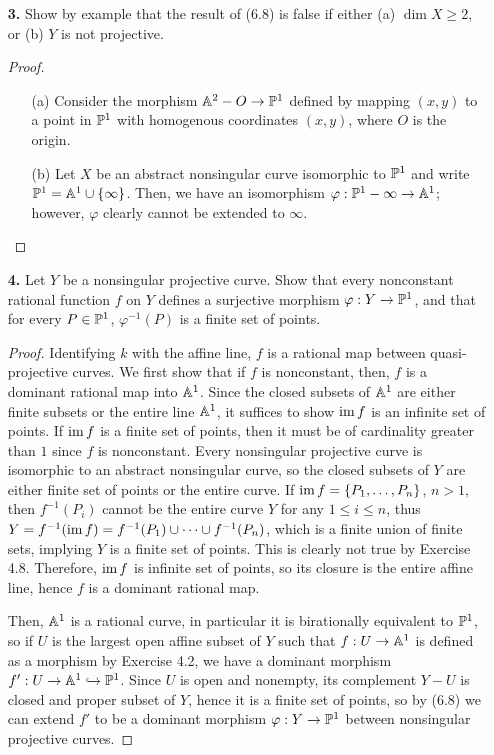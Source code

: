 \documentclass{article}
\begin{document}
\begin{enumerate} [label=\textbf{\arabic*.}, leftmargin=0cm]
\item[\textbf{3.}] Show by example that the result of (6.8) is false if either (a) $\dim{X} \geq 2$, or (b) $Y$ is not projective.

\begin{proof} $ $ \vspace{0pt}
  \begin{itemize} [leftmargin=0cm]
    \item[(a)] Consider the morphism $\mathbb{A}^2 - O \to \mathbb{P}^1$ defined by mapping $(x, y)$ to a point in $\mathbb{P}^1$ with homogenous coordinates $(x, y)$, where $O$ is the origin.

    \item[(b)] Let $X$ be an abstract nonsingular curve isomorphic to $\mathbb{P}^1$ and write $\mathbb{P}^1 = \mathbb{A}^1 \cup \{ \infty \}$. Then, we have an isomorphism $\varphi : \mathbb{P}^1 - \infty \to \mathbb{A}^1$; however, $\varphi$ clearly cannot be extended to $\infty$.
  \end{itemize}
\end{proof}
\filbreak

\item[\textbf{4.}] Let $Y$ be a nonsingular projective curve. Show that every nonconstant rational function $f$ on $Y$ defines a surjective morphism $\varphi : Y \to \mathbb{P}^1$, and that for every $P \in \mathbb{P}^1$, $\varphi^{-1}(P)$ is a finite set of points.

\begin{proof}
  Identifying $k$ with the affine line, $f$ is a rational map between quasi-projective curves. We first show that if $f$ is nonconstant, then, $f$ is a dominant rational map into $\mathbb{A}^1$. Since the closed subsets of $\mathbb{A}^1$ are either finite subsets or the entire line $\mathbb{A}^1$, it suffices to show $\operatorname{im}{f}$ is an infinite set of points. If $\operatorname{im}{f}$ is a finite set of points, then it must be of cardinality greater than $1$ since $f$ is nonconstant. Every nonsingular projective curve is isomorphic to an abstract nonsingular curve, so the closed subsets of $Y$ are either finite set of points or the entire curve. If $\operatorname{im}{f} = \{ P_1, \dots, P_n \}$, $n > 1$, then $f^{-1}(P_i)$ cannot be the entire curve $Y$ for any $1 \leq i \leq n$, thus $Y = f^{-1}(\operatorname{im}{f}) = f^{-1}(P_1) \cup \dots \cup f^{-1}(P_n)$, which is a finite union of finite sets, implying $Y$ is a finite set of points. This is clearly not true by Exercise 4.8. Therefore, $\operatorname{im}{f}$ is infinite set of points, so its closure is the entire affine line, hence $f$ is a dominant rational map.

  Then, $\mathbb{A}^1$ is a rational curve, in particular it is birationally equivalent to $\mathbb{P}^1$, so if $U$ is the largest open affine subset of $Y$ such that $f : U \to \mathbb{A}^1$ is defined as a morphism by Exercise 4.2, we have a dominant morphism $f' : U \to \mathbb{A}^1 \hookrightarrow \mathbb{P}^1$. Since $U$ is open and nonempty, its complement $Y - U$ is closed and proper subset of $Y$, hence it is a finite set of points, so by (6.8) we can extend $f'$ to be a dominant morphism $\varphi: Y \to \mathbb{P}^1$ between nonsingular projective curves. 
  

\end{proof}
\end{enumerate}
\end{document}
